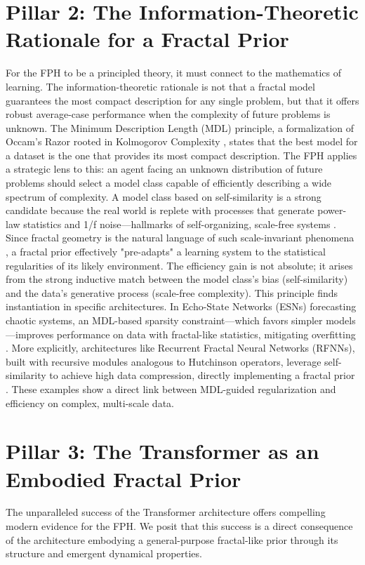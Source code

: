 \documentclass[11pt,a4paper]{article}
\begin{document}
\section{Pillar 2: The Information-Theoretic Rationale for a Fractal Prior}
For the FPH to be a principled theory, it must connect to the mathematics of learning. The information-theoretic rationale is not that a fractal model guarantees the most compact description for any single problem, but that it offers robust average-case performance when the complexity of future problems is unknown.
The Minimum Description Length (MDL) principle, a formalization of Occam's Razor rooted in Kolmogorov Complexity \citep{li2009kolmogorov}, states that the best model for a dataset is the one that provides its most compact description. The FPH applies a strategic lens to this: an agent facing an unknown distribution of future problems should select a model class capable of efficiently describing a wide spectrum of complexity. A model class based on self-similarity is a strong candidate because the real world is replete with processes that generate power-law statistics and 1/f noise—hallmarks of self-organizing, scale-free systems \citep{gershenson2025self}. Since fractal geometry is the natural language of such scale-invariant phenomena \citep{falconer2004fractal}, a fractal prior effectively "pre-adapts" a learning system to the statistical regularities of its likely environment. The efficiency gain is not absolute; it arises from the strong inductive match between the model class's bias (self-similarity) and the data's generative process (scale-free complexity).
This principle finds instantiation in specific architectures. In Echo-State Networks (ESNs) forecasting chaotic systems, an MDL-based sparsity constraint—which favors simpler models—improves performance on data with fractal-like statistics, mitigating overfitting \citep{lymburn2024reservoir}. More explicitly, architectures like Recurrent Fractal Neural Networks (RFNNs), built with recursive modules analogous to Hutchinson operators, leverage self-similarity to achieve high data compression, directly implementing a fractal prior \citep{stetter2012fractal}. These examples show a direct link between MDL-guided regularization and efficiency on complex, multi-scale data.

\section{Pillar 3: The Transformer as an Embodied Fractal Prior}
The unparalleled success of the Transformer architecture offers compelling modern evidence for the FPH. We posit that this success is a direct consequence of the architecture embodying a general-purpose fractal-like prior through its structure and emergent dynamical properties.
\end{document}
